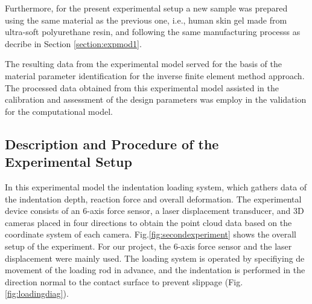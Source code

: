 Furthermore, for the present experimental setup a new sample was prepared using 
the same material as the previous one, i.e., human skin gel made from ultra-soft 
polyurethane resin, and following the same 
manufacturing processs as decribe in Section \ref{section:expmod1}. 

The resulting data from the experimental model served for the basis of the material 
parameter identification for the inverse finite element method approach.
The processed data obtained from this experimental model assisted in the calibration 
and assessment of the design parameters was employ in the validation for the 
computational model. 

\subsection*{Description and Procedure of the Experimental Setup}

In this experimental model the indentation loading system, which gathers data of the indentation 
depth, reaction force and overall deformation. 
The experimental device consists of an 6-axis force sensor, a laser displacement transducer,
 and 3D cameras placed in four directions to obtain the point cloud data based on the 
 coordinate system of each camera. Fig.\ref{fig:secondexperiment} shows the overall setup of the 
 experiment. For our project, the 6-axis force sensor and the laser displacement were mainly used.
The loading system is operated by specifiying de movement of the loading rod in advance, and the 
indentation is performed in the direction normal to the contact surface to prevent slippage (Fig. \ref{fig:loadingdiag}).\\


